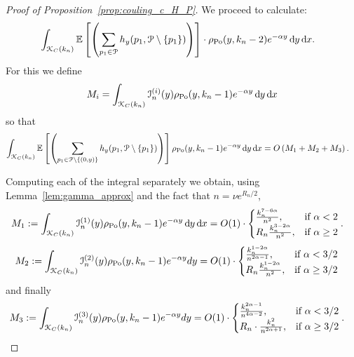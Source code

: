 \begin{proof}[Proof of Proposition~\ref{prop:couling_c_H_P}]
We proceed to calculate:
\begin{align*}
&\int_{{\mathcal K}_{C}(k_n)} \mathbb{E}\left[\left( \sum_{p_1 \in {\mathcal P}} h_y (p_1, {\mathcal P} \setminus \{ p_1 \})\right)\right] \cdot 
 \rho_{{\mathrm{Po}}}(y,k_n-2) e^{-\alpha y} \operatorname{\mathrm{d}\hspace{-2pt}} y \operatorname{\mathrm{d}\hspace{-2pt}} x.
\end{align*}
For this we define
\[
	M_i = \int_{{\mathcal K}_{C}(k_n)} \mathcal{I}_n^{(i)}(y) \rho_{{\mathrm{Po}}}(y,k_n-1) e^{-\alpha y} \operatorname{\mathrm{d}\hspace{-2pt}} y \operatorname{\mathrm{d}\hspace{-2pt}} x
\]
so that
\begin{align*}
\int_{{\mathcal K}_{C}(k_n)} \mathbb{E}\left[\left( \sum_{p_1 \in {\mathcal P} \setminus \{(0,y)\}} h_y (p_1, {\mathcal P} \setminus \{ p_1 \})\right)\right] \rho_{{\mathrm{Po}}}(y,k_n-1) e^{-\alpha y} \operatorname{\mathrm{d}\hspace{-2pt}} y \operatorname{\mathrm{d}\hspace{-2pt}} x 
&= O\left(M_1 + M_2 + M_3\right).
\end{align*}

Computing each of the integral separately we obtain, using Lemma~\ref{lem:gamma_approx} and the fact that $n = \nu e^{R_n/2}$,
\begin{align*} 
M_1:= \int_{{\mathcal K}_{C}(k_n)} \mathcal{I}_n^{(1)}(y) \rho_{{\mathrm{Po}}}(y,k_n-1) e^{-\alpha y} \operatorname{\mathrm{d}\hspace{-2pt}} y \operatorname{\mathrm{d}\hspace{-2pt}} x
&= O(1) \cdot 
\begin{cases} 
	\frac{k_n^{7-6\alpha}}{n^2}, & \mbox{if $\alpha <2$} \\
	R_n \frac{k_n^{3-2\alpha}}{n^2}, & \mbox{if $\alpha \geq 2$}
\end{cases}. 
\end{align*}
\begin{align*} 
M_2:= \int_{{\mathcal K}_{C}(k_n)} \mathcal{I}_n^{(2)}(y) \rho_{{\mathrm{Po}}}(y,k_n-1) e^{-\alpha y} dy
&= O(1) \cdot 
\begin{cases}
\frac{k_n^{1-2\alpha}}{n^{2\alpha-1}}, & \mbox{if $\alpha < 3/2$} \\
R_n   \frac{k_n^{1-2\alpha}}{n^{2}}, & \mbox{if $\alpha \geq 3/2$}
\end{cases}
\end{align*}
and finally 
\begin{align*} 
M_3:= \int_{{\mathcal K}_{C}(k_n)} \mathcal{I}_n^{(3)}(y) \rho_{{\mathrm{Po}}}(y,k_n-1) e^{-\alpha y} dy
&= O(1) \cdot 
\begin{cases} 
\frac{k_n^{2\alpha - 1}}{n^{4\alpha -2}}, & \mbox{if $\alpha <3/2$} \\ 
R_n \cdot \frac{k_n^2}{n^{2\alpha+1}}, &\mbox{if $\alpha \geq 3/2$}
\end{cases}  .
\end{align*}


\end{proof}
